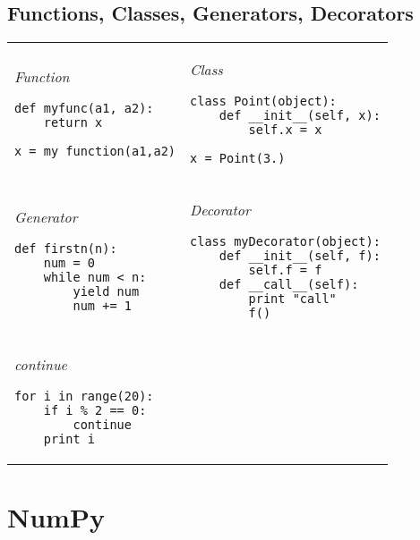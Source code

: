 \documentclass[10pt, a4paper, twocolumn]{article}
\begin{document}
\subsection*{Functions, Classes, Generators, Decorators}
\begin{tabular}{ p{} p{} }
    \begin{minipage}[t]{\columnwidth}
    \textit{Function}
\begin{verbatim}
def myfunc(a1, a2):
    return x

x = my_function(a1,a2)
\end{verbatim}
\end{minipage}
&
\begin{minipage}[t]{\columnwidth}
    \textit{Class}
\begin{verbatim}
class Point(object):
    def __init__(self, x):
        self.x = x

x = Point(3.)
\end{verbatim}
\end{minipage}\\
\rule{0pt}{0.5cm}

\begin{minipage}[t]{\columnwidth}
    \textit{Generator}
\begin{verbatim}
def firstn(n):
    num = 0
    while num < n:
        yield num
        num += 1
\end{verbatim}
\end{minipage}
&
\begin{minipage}[t]{\columnwidth}
    \textit{Decorator}
\begin{verbatim}
class myDecorator(object):
    def __init__(self, f):
        self.f = f
    def __call__(self):
        print "call"
        f()
\end{verbatim}
\end{minipage}\\
\rule{0pt}{0.5cm}

\begin{minipage}[t]{\columnwidth}
    \textit{continue}
\begin{verbatim}
for i in range(20):
    if i % 2 == 0:
        continue
    print i
\end{verbatim}
\end{minipage}
&
\end{tabular}


\section*{NumPy}
\end{document}
